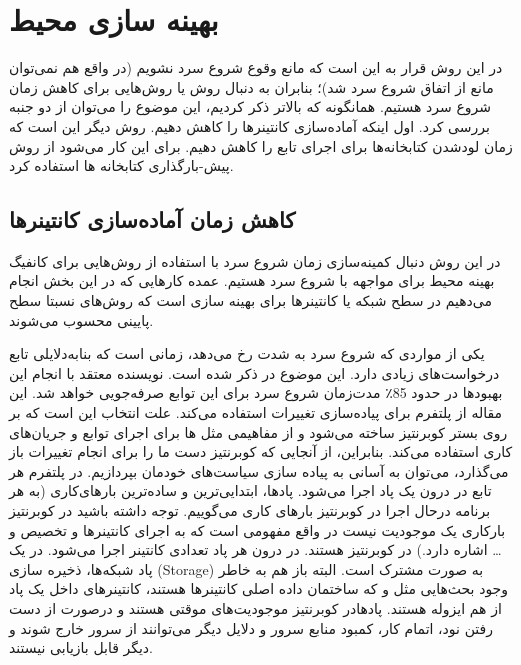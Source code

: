 \section{ بهینه سازی محیط}
          
          در این روش قرار به این است که مانع وقوع شروع سرد نشویم (در واقع هم نمی‌توان مانع از اتفاق شروع سرد شد)؛ بنابران به دنبال روش‌ یا روش‌هایی برای کاهش زمان شروع سرد هستیم. همانگونه که بالاتر ذکر کردیم، این موضوع را می‌توان از دو جنبه بررسی کرد. اول اینکه آماده‌سازی کانتینر‌ها را کاهش دهیم. روش دیگر این است که زمان لودشدن کتابخانه‌ها برای اجرای تابع را کاهش دهیم. برای این کار می‌شود از روش پیش-بارگذاری کتابخانه ها استفاده کرد.  
          
\subsection{کاهش زمان آماده‌سازی کانتینرها}

در این روش دنبال کمینه‌سازی زمان شروع سرد با استفاده از روش‌هایی برای کانفیگ بهینه محیط برای مواجهه با شروع سرد هستیم. عمده کارهایی که در این بخش انجام می‌دهیم در سطح شبکه یا کانتینر‌ها برای بهینه سازی است که روش‌های نسبتا سطح پایینی محسوب می‌شوند. 

یکی از مواردی که شروع سرد به شدت رخ می‌دهد، زمانی است که بنابه‌دلایلی تابع درخواست‌های زیادی دارد. این موضوع در \cite{lin2019mitigating} ذکر شده است. نویسنده معتقد با انجام این بهبودها در حدود 85٪ مدت‌زمان شروع سرد برای این توابع صرفه‌جویی خواهد شد. این مقاله از پلتفرم  برای پیاده‌سازی تغییرات استفاده می‌کند. علت انتخاب  این است که بر روی بستر کوبرنتیز ساخته می‌شود و از مفاهیمی مثل  ها برای اجرای توابع و جریان‌های کاری استفاده می‌کند. بنابراین، از آنجایی که کوبرنتیز دست ما را برای انجام تغییرات باز می‌گذارد، می‌توان به آسانی به پیاده سازی سیاست‌های خودمان بپردازیم. در پلتفرم  هر تابع در درون یک پاد اجرا می‌شود. پادها، ابتدایی‌ترین و ساده‌ترین بارهای‌کاری (به هر برنامه درحال اجرا در کوبرنتیز بارهای کاری می‌گوییم. توجه داشته باشید در کوبرنتیز بارکاری یک موجودیت نیست در واقع مفهومی است که به اجرای کانتینر‌ها و تخصیص  و … اشاره دارد.) در کوبرنتیز هستند. در درون هر پاد تعدادی کانتینر اجرا می‌شود. در یک پاد شبکه‌ها، ذخیره سازی (Storage)‌ به صورت مشترک است. البته باز هم به خاطر وجود بحث‌هایی مثل  و  که ساختمان داده اصلی کانتینرها هستند، کانتینرهای داخل یک پاد از هم ایزوله هستند. پادهادر کوبرنتیز موجودیت‌های موقتی هستند و درصورت از دست رفتن نود، اتمام کار، کمبود منابع سرور و دلایل دیگر می‌توانند از سرور خارج شوند و دیگر قابل بازیابی نیستند. 

